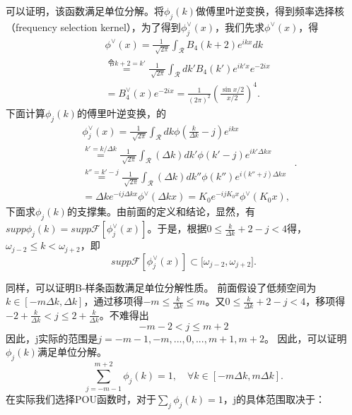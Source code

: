 可以证明，该函数满足单位分解。将$\phi_j(k)$做傅里叶逆变换，得到频率选择核（frequency selection kernel），为了得到$\phi_{j}^{\vee}(x)$，我们先求$\phi^{\vee}(x)$，得
\begin{equation}
    \begin{aligned} 
        &\phi^{\vee}(x) =\frac{1}{\sqrt[]{2\pi } }\int_{\mathcal{R} }^{}  B_4(k+2)e^{ikx}dk \\
      &\overset{令k+2=k'}{=} \frac{1}{\sqrt[]{2\pi } }\int_{\mathcal{R} }^{}dk'B_4(k')e^{ik'x}e^{-2ix}\\
      &=B_4^{\vee } (x)e^{-2ix}=\frac{1}{(2\pi)^2}(\frac{\sin{x/2}}{x/2})^4 .
      \end{aligned}
\end{equation}
下面计算$\phi_j(k)$的傅里叶逆变换，的
\begin{equation}
    \begin{aligned} 
        & \phi_{j}^{\vee}(x)=\frac{1}{\sqrt[]{2\pi } }\int_{\mathcal{R} }^{}dk\phi(\frac{k}{\Delta k}-j )e^{ikx}  \\
       &\overset{k'=k/\Delta k}{=}\frac{1}{\sqrt[]{2\pi } }\int_{\mathcal{R} }^{}  (\Delta k)dk'\phi (k'-j)e^{ik'\Delta kx}  \\
       &\overset{k''=k'-j}{=}\frac{1}{\sqrt[]{2\pi } }\int_{\mathcal{R} }^{}  (\Delta k)dk''\phi (k'')e^{i(k''+j)\Delta kx}\\
       &=\Delta ke^{-ij\Delta kx}\phi^{\vee}(\Delta kx)=K_0e^{-ijK_{0}x}%
       \phi^{\vee}(K_{0}x),
       \end{aligned}.
\end{equation}
下面求$\phi_{j}(k)$的支撑集。由前面的定义和结论，显然，有$supp\phi _j(k)=supp\mathcal{F}[\phi_{j}^{\vee}(x)]$。于是，根据$0\le \frac{k}{\Delta k}+2-j<4$得，$\omega_{j-2}\le k<\omega_{j+2}$，即
\begin{equation}
    supp\mathcal{F}[\phi_{j}^{\vee}(x)]\subset\lbrack\omega_{j-2}, \omega_{j+2}].
\end{equation}

同样，可以证明B-样条函数满足单位分解性质。
前面假设了低频空间为$k\in [-m\Delta k,\Delta k]$，通过移项得$-m\le \frac{k}{\Delta k}\le m$。又$0\le \frac{k}{\Delta k}+2-j<4$，移项得$-2+\frac{k}{\Delta k}<j\le 2+\frac{k}{\Delta k}$。不难得出
\begin{equation*}
    -m-2<j\le m+2
\end{equation*}
因此，j实际的范围是$j = -m-1,-m,...,0,...,m+1,m+2$。
因此，可以证明$\phi_{j}(k)$满足单位分解。
\begin{equation}\label{eq:sum1C4}
  \sum_{j=-m-1}^{m+2}\phi_j(k) = 1 ,\quad \forall k\in [-m\Delta k, m\Delta k].
\end{equation}
在实际我们选择POU函数时，对于$\sum_{j}^{}\phi_j(k) = 1$，j的具体范围取决于：

